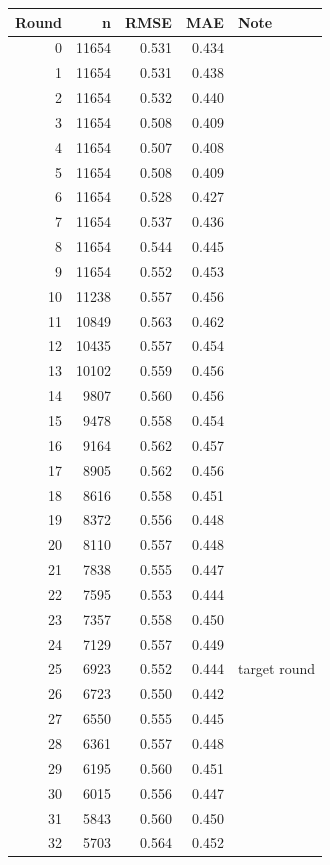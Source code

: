 \documentclass[11pt]{article}
\begin{document}
\bigskip
\begin{longtable}{rrrrl}
\toprule
\textbf{Round} & \textbf{n} & \textbf{RMSE} & \textbf{MAE} & \textbf{Note} \\
\midrule
\endhead
0  & 11654 & 0.531 & 0.434 & \\
1  & 11654 & 0.531 & 0.438 & \\
2  & 11654 & 0.532 & 0.440 & \\
3  & 11654 & 0.508 & 0.409 & \\
4  & 11654 & 0.507 & 0.408 & \\
5  & 11654 & 0.508 & 0.409 & \\
6  & 11654 & 0.528 & 0.427 & \\
7  & 11654 & 0.537 & 0.436 & \\
8  & 11654 & 0.544 & 0.445 & \\
9  & 11654 & 0.552 & 0.453 & \\
10 & 11238 & 0.557 & 0.456 & \\
11 & 10849 & 0.563 & 0.462 & \\
12 & 10435 & 0.557 & 0.454 & \\
13 & 10102 & 0.559 & 0.456 & \\
14 &  9807 & 0.560 & 0.456 & \\
15 &  9478 & 0.558 & 0.454 & \\
16 &  9164 & 0.562 & 0.457 & \\
17 &  8905 & 0.562 & 0.456 & \\
18 &  8616 & 0.558 & 0.451 & \\
19 &  8372 & 0.556 & 0.448 & \\
20 &  8110 & 0.557 & 0.448 & \\
21 &  7838 & 0.555 & 0.447 & \\
22 &  7595 & 0.553 & 0.444 & \\
23 &  7357 & 0.558 & 0.450 & \\
24 &  7129 & 0.557 & 0.449 & \\
25 &  6923 & 0.552 & 0.444 & target round \\
26 &  6723 & 0.550 & 0.442 & \\
27 &  6550 & 0.555 & 0.445 & \\
28 &  6361 & 0.557 & 0.448 & \\
29 &  6195 & 0.560 & 0.451 & \\
30 &  6015 & 0.556 & 0.447 & \\
31 &  5843 & 0.560 & 0.450 & \\
32 &  5703 & 0.564 & 0.452 & \\

\end{longtable}
\end{document}
